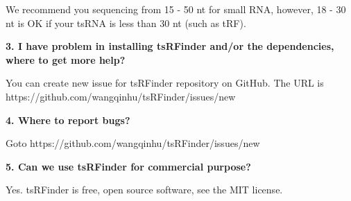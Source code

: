 \documentclass[11pt, a4paper]{article}
\begin{document}
We recommend you sequencing from 15 - 50 nt for small RNA, however, 18 - 30 nt is OK if your tsRNA is less than 30 nt (such as tRF).

\textbf{3. I have problem in installing tsRFinder and/or the dependencies, where to get more help?}

You can create new issue for tsRFinder repository on GitHub. The URL is https://github.com/wangqinhu/tsRFinder/issues/new

\textbf{4. Where to report bugs?}

Goto https://github.com/wangqinhu/tsRFinder/issues/new

\textbf{5. Can we use tsRFinder for commercial purpose?}

Yes. tsRFinder is free, open source software, see the MIT license.
\end{document}
